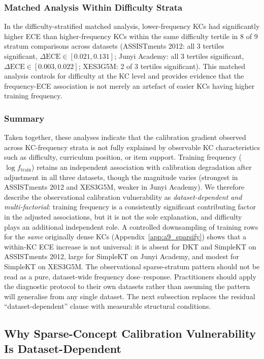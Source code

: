 \subsubsection*{Matched Analysis Within Difficulty Strata}
In the difficulty-stratified matched analysis, lower-frequency KCs had significantly higher ECE than higher-frequency KCs within the same difficulty tertile in 8 of 9 stratum comparisons across datasets (ASSISTments 2012: all 3 tertiles significant, $\Delta\text{ECE} \in [0.021, 0.131]$; Junyi Academy: all 3 tertiles significant, $\Delta\text{ECE} \in [0.003, 0.022]$; XES3G5M: 2 of 3 tertiles significant). This matched analysis controls for difficulty at the KC level and provides evidence that the frequency-ECE association is not merely an artefact of easier KCs having higher training frequency.

\subsubsection*{Summary}
Taken together, these analyses indicate that the calibration gradient observed across KC-frequency strata is not fully explained by observable KC characteristics such as difficulty, curriculum position, or item support. Training frequency ($\log f_{\text{train}}$) retains an independent association with calibration degradation after adjustment in all three datasets, though the magnitude varies (strongest in ASSISTments 2012 and XES3G5M, weaker in Junyi Academy). We therefore describe the observational calibration vulnerability as \emph{dataset-dependent and multi-factorial}: training frequency is a consistently significant contributing factor in the adjusted associations, but it is not the sole explanation, and difficulty plays an additional independent role. A controlled downsampling of training rows for the \emph{same} originally dense KCs (Appendix~\ref{app:a9_sparsify}) shows that a within-KC ECE increase is not universal: it is absent for DKT and SimpleKT on ASSISTments 2012, large for SimpleKT on Junyi Academy, and modest for SimpleKT on XES3G5M. The observational sparse-stratum pattern should not be read as a pure, dataset-wide frequency dose--response. Practitioners should apply the diagnostic protocol to their own datasets rather than assuming the pattern will generalise from any single dataset. The next subsection replaces the residual ``dataset-dependent'' clause with measurable structural conditions.

\subsection{Why Sparse-Concept Calibration Vulnerability Is Dataset-Dependent}
\label{sec:a5_dataset_dependent}

